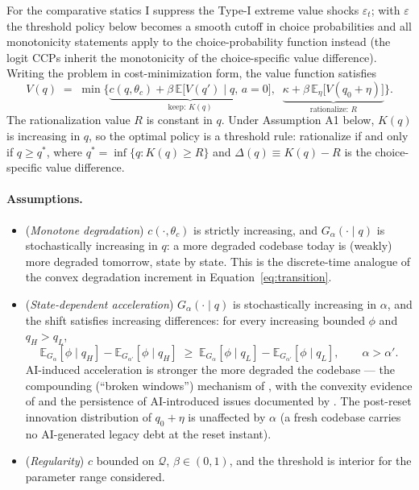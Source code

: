 For the comparative statics I suppress the Type-I extreme value shocks
$\varepsilon_t$; with $\varepsilon$ the threshold policy below becomes a
smooth cutoff in choice probabilities and all monotonicity statements apply
to the choice-probability function instead (the logit CCPs inherit the
monotonicity of the choice-specific value difference). Writing the problem
in cost-minimization form, the value function satisfies
\begin{equation}
    V(q) \;=\; \min\Big\{
        \underbrace{c(q,\theta_c) + \beta\, \mathbb{E}\big[V(q') \mid q,\, a=0\big]}_{\text{keep: } K(q)},\;\;
        \underbrace{\kappa + \beta\, \mathbb{E}_\eta\big[V(q_0 + \eta)\big]}_{\text{rationalize: } R}
    \Big\}.
    \label{eq:bellman_costmin}
\end{equation}
The rationalization value $R$ is constant in $q$. Under Assumption A1 below,
$K(q)$ is increasing in $q$, so the optimal policy is a threshold rule:
rationalize if and only if $q \geq q^*$, where
$q^* = \inf\{q : K(q) \geq R\}$ and $\Delta(q) \equiv K(q) - R$ is the
choice-specific value difference.

\paragraph{Assumptions.}
\begin{itemize}
    \item[\textbf{A1}] (\emph{Monotone degradation}) $c(\cdot,\theta_c)$ is
    strictly increasing, and $G_\alpha(\cdot \mid q)$ is stochastically
    increasing in $q$: a more degraded codebase today is (weakly) more
    degraded tomorrow, state by state. This is the discrete-time analogue
    of the convex degradation increment in Equation~\eqref{eq:transition}.
    \item[\textbf{A2}] (\emph{State-dependent acceleration}) $G_\alpha(\cdot
    \mid q)$ is stochastically increasing in $\alpha$, and the shift
    satisfies increasing differences: for every increasing bounded $\phi$
    and $q_H > q_L$,
    \[
        \mathbb{E}_{G_{\alpha}}[\phi \mid q_H] - \mathbb{E}_{G_{\alpha'}}[\phi \mid q_H]
        \;\geq\;
        \mathbb{E}_{G_{\alpha}}[\phi \mid q_L] - \mathbb{E}_{G_{\alpha'}}[\phi \mid q_L],
        \qquad \alpha > \alpha'.
    \]
    AI-induced acceleration is stronger the more degraded the codebase ---
    the compounding (``broken windows'') mechanism of
    \citet{avgeriou2024}, with the convexity evidence of \citet{borg2024}
    and the persistence of AI-introduced issues documented by
    \citet{liu2026}. The post-reset innovation distribution of
    $q_0 + \eta$ is unaffected by $\alpha$ (a fresh codebase carries no
    AI-generated legacy debt at the reset instant).
    \item[\textbf{A3}] (\emph{Regularity}) $c$ bounded on $\mathcal{Q}$,
    $\beta \in (0,1)$, and the threshold is interior for the parameter
    range considered.
\end{itemize}


